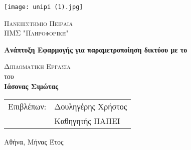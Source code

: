 \begin{titlepage}
    \begin{center}
        \vspace*{-1cm}
        
        \texttt{[image: unipi (1).jpg]}
        
        \Large
        \textsc{Πανεπιστήμιο Πειραιά}\\
        \large
        \textsc{ΠΜΣ "Πληροφορική"}\\
        
        \vspace{2.5cm}
        
        \Huge
        \textbf{Ανάπτυξη Εφαρμογής για παραμετροποίηση δικτύου με το }
        
        \vspace{3cm}
        \Large
        \textsc{Διπλωματικη Εργασια}\\
        του\\

        \LARGE
        \textbf{Ιάσονας  Σιμώτας}
        
    \end{center}
    
    \vspace{3cm}
    
   

    \begin{tabular}{ll}
		Επιβλέπων: & Δουληγέρης Χρήστος \\
		 & Καθηγητής ΠΑΠΕΙ
	\end{tabular}
	
    \vfill
    
    \begin{center}
    	 Αθήνα, Μήνας Έτος	
    \end{center}
\end{titlepage}